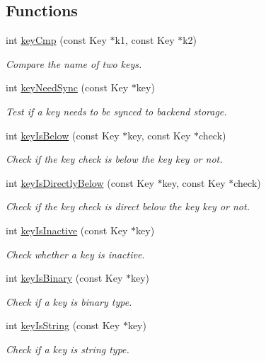 \subsection*{Functions}
\begin{DoxyCompactItemize}
\item 
int \mbox{\hyperlink{group__keytest_gaf6e66e12fe04d535a5d1c8218ced803e}{key\+Cmp}} (const Key $\ast$k1, const Key $\ast$k2)
\begin{DoxyCompactList}\small\item\em Compare the name of two keys. \end{DoxyCompactList}\item 
int \mbox{\hyperlink{group__keytest_gaf247df0de7aca04b32ef80e39ef12950}{key\+Need\+Sync}} (const Key $\ast$key)
\begin{DoxyCompactList}\small\item\em Test if a key needs to be synced to backend storage. \end{DoxyCompactList}\item 
int \mbox{\hyperlink{group__keytest_ga03332b5d97c76a4fd2640aca4762b8df}{key\+Is\+Below}} (const Key $\ast$key, const Key $\ast$check)
\begin{DoxyCompactList}\small\item\em Check if the key check is below the key key or not. \end{DoxyCompactList}\item 
int \mbox{\hyperlink{group__keytest_ga0150fb549225d8789e7297b919965e72}{key\+Is\+Directly\+Below}} (const Key $\ast$key, const Key $\ast$check)
\begin{DoxyCompactList}\small\item\em Check if the key check is direct below the key key or not. \end{DoxyCompactList}\item 
int \mbox{\hyperlink{group__keytest_gaa25f699f592031c1a0abc1504d14e13e}{key\+Is\+Inactive}} (const Key $\ast$key)
\begin{DoxyCompactList}\small\item\em Check whether a key is inactive. \end{DoxyCompactList}\item 
int \mbox{\hyperlink{group__keytest_ga9526b371087564e43e3dff8ad0dac949}{key\+Is\+Binary}} (const Key $\ast$key)
\begin{DoxyCompactList}\small\item\em Check if a key is binary type. \end{DoxyCompactList}\item 
int \mbox{\hyperlink{group__keytest_gaea7670778abd07fee0fe8ac12a149190}{key\+Is\+String}} (const Key $\ast$key)
\begin{DoxyCompactList}\small\item\em Check if a key is string type. \end{DoxyCompactList}\end{DoxyCompactItemize}


